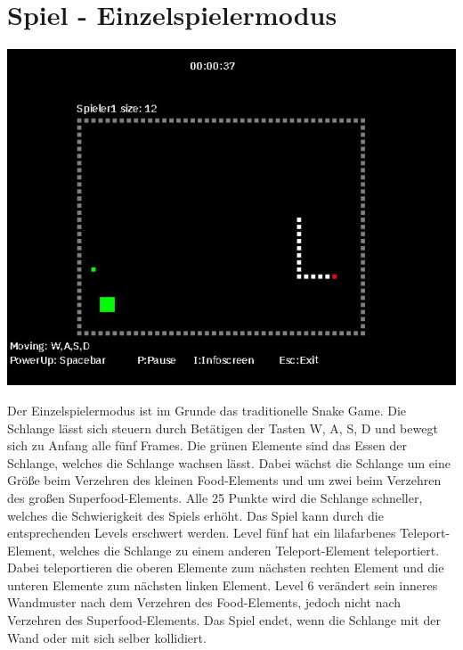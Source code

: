 \section{Spiel - Einzelspielermodus}
\label{Spiel_-_Einzelspielermodus}
%
\begin{minipage}[X]{1.1\textwidth}
 \centering
 \includegraphics[scale=0.5]{bilder/Einzelspielermodus}
 \label{fig:einzelspielermodus}
\end{minipage}
	Der Einzelspielermodus ist im Grunde das traditionelle Snake Game. Die Schlange l{\"a}sst sich steuern durch Bet{\"a}tigen der Tasten \glqq W\grqq{}, \glqq  A\grqq{}, \glqq S\grqq{}, \glqq D\grqq{} und bewegt sich zu Anfang alle f{\"u}nf Frames. Die gr{\"u}nen Elemente sind das Essen der Schlange, welches die Schlange wachsen l{\"a}sst. Dabei w{\"a}chst die Schlange um eine Gr{\"o}{\ss}e beim Verzehren des kleinen Food-Elements und um zwei beim Verzehren des gro{\ss}en Superfood-Elements. Alle 25 Punkte wird die Schlange schneller, welches die Schwierigkeit des Spiels erhöht.
	Das Spiel kann durch die entsprechenden Levels erschwert werden. Level f{\"u}nf hat ein lilafarbenes Teleport-Element, welches die Schlange zu einem anderen Teleport-Element teleportiert. Dabei teleportieren die oberen Elemente zum n{\"a}chsten rechten Element und die unteren Elemente zum n{\"a}chsten linken Element. Level 6 ver{\"a}ndert sein inneres Wandmuster nach dem Verzehren des Food-Elements, jedoch nicht nach Verzehren des Superfood-Elements. Das Spiel endet, wenn die Schlange mit der Wand oder mit sich selber kollidiert.   

